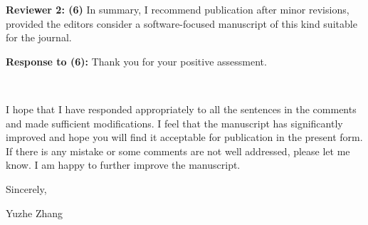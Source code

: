 \documentclass{article}
\newcommand{\refereeNoTwoBox}[2]{
  \begin{mdframed}[linecolor=black]
  \noindent \textbf{Reviewer 2: (#1)} #2
  \end{mdframed}
}
\newcommand{\response}[2]{
  \noindent \textbf{Response to (#1):} #2
}
\begin{document}
\refereeNoTwoBox{6}{
    In summary, I recommend publication after minor revisions, provided the editors consider a software-focused manuscript of this kind suitable for the journal.
}

\response{6}{
    Thank you for your positive assessment. 
}
~\
~\

I hope that I have responded appropriately to all the sentences in the comments and made sufficient modifications. 
I feel that the manuscript has significantly improved and hope you will find it acceptable for publication in the present form. 
If there is any mistake or some comments are not well addressed, please let me know. I am happy to further improve the manuscript. 

\noindent Sincerely,


\noindent Yuzhe Zhang



\end{document}
